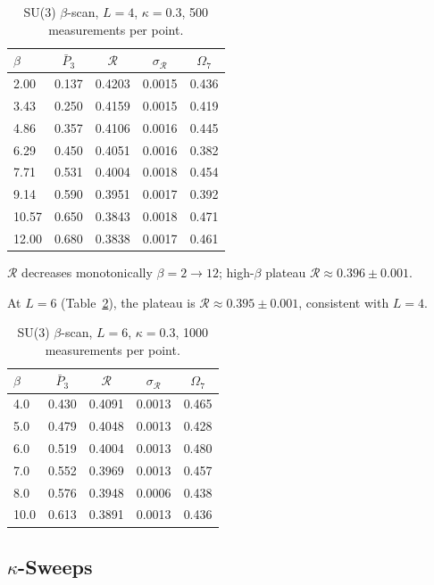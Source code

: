 \documentclass[12pt,a4paper]{article}
\newcommand{\R}{\mathcal{R}}           %
\theoremstyle{plain}
\theoremstyle{definition}
\theoremstyle{remark}
\begin{document}
\begin{table}[ht]
\centering
\caption{SU(3) $\beta$-scan, $L=4$, $\kappa=0.3$, 500 measurements per point.}
\label{tab:su3_bscan_L4}
\begin{tabular}{lcccc}
\toprule
$\beta$ & $\bar{P}_3$ & $\R$ & $\sigma_\R$ & $\Omega_7$ \\
\midrule
 2.00 & 0.137 & 0.4203 & 0.0015 & 0.436 \\
 3.43 & 0.250 & 0.4159 & 0.0015 & 0.419 \\
 4.86 & 0.357 & 0.4106 & 0.0016 & 0.445 \\
 6.29 & 0.450 & 0.4051 & 0.0016 & 0.382 \\
 7.71 & 0.531 & 0.4004 & 0.0018 & 0.454 \\
 9.14 & 0.590 & 0.3951 & 0.0017 & 0.392 \\
10.57 & 0.650 & 0.3843 & 0.0018 & 0.471 \\
12.00 & 0.680 & 0.3838 & 0.0017 & 0.461 \\
\bottomrule
\end{tabular}
\end{table}

$\R$ decreases monotonically $\beta=2\to12$; high-$\beta$ plateau $\R\approx0.396\pm0.001$.

At $L=6$ (Table~\ref{tab:su3_bscan_L6}), the plateau is $\R\approx0.395\pm 0.001$,
consistent with $L=4$.

\begin{table}[ht]
\centering
\caption{SU(3) $\beta$-scan, $L=6$, $\kappa=0.3$, 1000 measurements per point.}
\label{tab:su3_bscan_L6}
\begin{tabular}{lcccc}
\toprule
$\beta$ & $\bar{P}_3$ & $\R$ & $\sigma_\R$ & $\Omega_7$ \\
\midrule
 4.0 & 0.430 & 0.4091 & 0.0013 & 0.465 \\
 5.0 & 0.479 & 0.4048 & 0.0013 & 0.428 \\
 6.0 & 0.519 & 0.4004 & 0.0013 & 0.480 \\
 7.0 & 0.552 & 0.3969 & 0.0013 & 0.457 \\
 8.0 & 0.576 & 0.3948 & 0.0006 & 0.438 \\
10.0 & 0.613 & 0.3891 & 0.0013 & 0.436 \\
\bottomrule
\end{tabular}
\end{table}

\subsection{$\kappa$-Sweeps}
\end{document}
